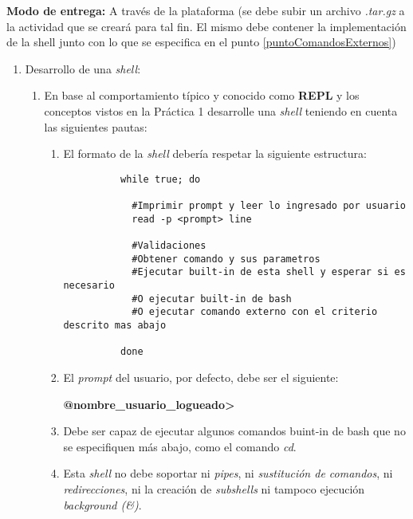 \textbf{Modo de entrega:} A través de la plataforma (se debe subir un archivo \textit{.tar.gz} a la actividad que se creará para tal fin. El mismo debe contener la implementación de la shell junto con lo que se especifica en el punto \ref{puntoComandosExternos})

\renewcommand{\labelenumiii}{\roman{enumiii})}

\begin{enumerate}
 \item Desarrollo de una \textit{shell}: \label{implementar_shell}
      \begin{enumerate}
	    \item En base al comportamiento típico y conocido como \textbf{REPL} y los conceptos vistos en la Práctica 1 desarrolle una \textit{shell} teniendo en cuenta las siguientes pautas:
	    \begin{enumerate}
	      \item El formato de la \textit{shell} debería respetar la siguiente estructura: 
	      \begin{lstlisting}
		  while true; do
		  
		    #Imprimir prompt y leer lo ingresado por usuario
			read -p <prompt> line		    

			#Validaciones
			#Obtener comando y sus parametros
		    #Ejecutar built-in de esta shell y esperar si es necesario
		    #O ejecutar built-in de bash
		    #O ejecutar comando externo con el criterio descrito mas abajo
		    
		  done
	      \end{lstlisting}
	      
	      \item El \textit{prompt} del usuario, por defecto, debe ser el siguiente: 

	      				\textbf{@nombre\_usuario\_logueado>}
	      
	      \item Debe ser capaz de ejecutar algunos comandos buint-in de bash que no se especifiquen más abajo, como el comando \textit{cd}.

	      \item Esta \textit{shell} no debe soportar ni \textit{pipes}, ni \textit{sustitución de comandos}, ni \textit{redirecciones}, ni la creación de \textit{subshells} ni tampoco ejecución \textit{background (\&)}.	      
	    \end{enumerate}
	    

\end{enumerate}
\end{enumerate}
